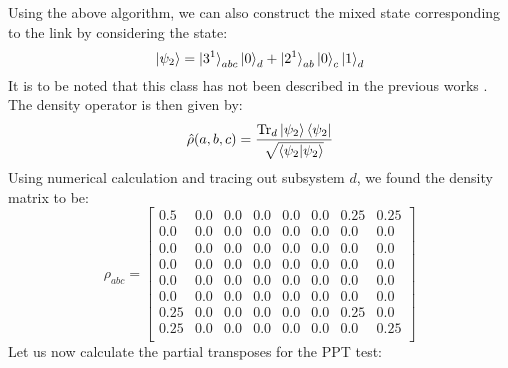 \documentclass{scrartcl}
\begin{document}
Using the above algorithm, we can also construct the mixed state corresponding to the link by considering the state:
$$\ket{\psi_2} = \ket{3^1}_{abc}\ket{0}_d + \ket{2^1}_{ab}\ket{0}_c\ket{1}_d$$
It is to be noted that this class has not been described in the previous works \cite{Aravind1997,Sugita2007-ko}. The density operator is then given by:
$$\hat{\rho}(a,b,c) = \frac{\Tr_d\ket{\psi_2}\bra{\psi_2}}{\sqrt{\braket{\psi_2|\psi_2}}} $$
Using numerical calculation and tracing out subsystem $d$, we found the density matrix to be:
\begin{equation*}
    \rho_{abc}=
    \left[
    \begin{array}{cccccccc}
    0.5 & 0.0 & 0.0 & 0.0 & 0.0 & 0.0 & 0.25 & 0.25 \\
    0.0 & 0.0 & 0.0 & 0.0 & 0.0 & 0.0 & 0.0 & 0.0 \\
    0.0 & 0.0 & 0.0 & 0.0 & 0.0 & 0.0 & 0.0 & 0.0 \\
    0.0 & 0.0 & 0.0 & 0.0 & 0.0 & 0.0 & 0.0 & 0.0 \\
    0.0 & 0.0 & 0.0 & 0.0 & 0.0 & 0.0 & 0.0 & 0.0 \\
    0.0 & 0.0 & 0.0 & 0.0 & 0.0 & 0.0 & 0.0 & 0.0 \\
    0.25 & 0.0 & 0.0 & 0.0 & 0.0 & 0.0 & 0.25 & 0.0 \\
    0.25 & 0.0 & 0.0 & 0.0 & 0.0 & 0.0 & 0.0 & 0.25 \\
    \end{array}
    \right]
    \end{equation*}
Let us now calculate the partial transposes for the PPT test: 
\end{document}
